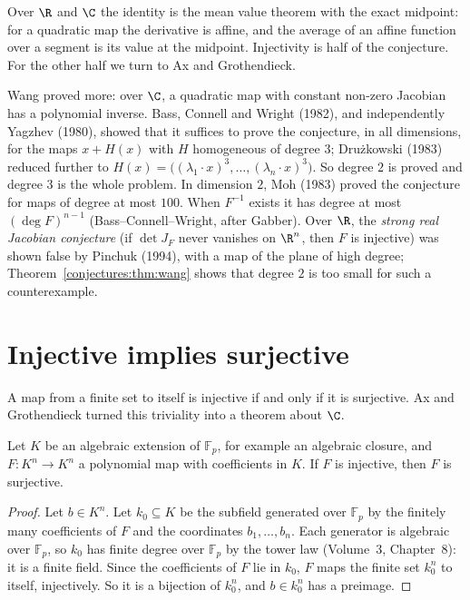 Over $\R$ and $\C$ the identity is the mean value theorem with the exact midpoint: for a quadratic map the derivative is affine, and the average of an affine
function over a segment is its value at the midpoint. Injectivity is half of the conjecture. For the other half we turn to Ax and Grothendieck.

\begin{remark}\label{conjectures:rem:jacknown}
Wang proved more: over $\C$, a quadratic map with constant non-zero Jacobian has a polynomial inverse. Bass, Connell and Wright (1982), and independently Yagzhev (1980), showed
that it suffices to prove the conjecture, in all dimensions, for the maps $x+H(x)$ with $H$ homogeneous of degree $3$; Dru\.zkowski (1983) reduced further to
$H(x)=\bigl((\lambda_1\cdot x)^3,\dots,(\lambda_n\cdot x)^3\bigr)$. So degree $2$ is proved and degree $3$ is the whole problem. In dimension $2$, Moh (1983)
proved the conjecture for maps of degree at most $100$. When $F^{-1}$ exists it has degree at most $(\deg F)^{n-1}$ (Bass--Connell--Wright, after Gabber).
Over $\R$, the \emph{strong real Jacobian conjecture} (if $\det J_F$ never vanishes on $\R^n$, then $F$ is injective) was shown false by Pinchuk
(1994), with a map of the plane of high degree; Theorem~\ref{conjectures:thm:wang} shows that degree $2$ is too small for such a counterexample.
\end{remark}

\section{Injective implies surjective}

A map from a finite set to itself is injective if and only if it is surjective. Ax and Grothendieck turned this triviality into a theorem about $\C$.

\begin{theorem}\label{conjectures:thm:axgr}
Let $K$ be an algebraic extension of $\mathbb F_p$, for example an algebraic closure, and $F:K^n\to K^n$ a polynomial map with coefficients in $K$. If $F$ is
injective, then $F$ is surjective.
\end{theorem}
\begin{proof}
Let $b\in K^n$. Let $k_0\subseteq K$ be the subfield generated over $\mathbb F_p$ by the finitely many coefficients of $F$ and the coordinates $b_1,\dots,b_n$.
Each generator is algebraic over $\mathbb F_p$, so $k_0$ has finite degree over $\mathbb F_p$ by the tower law (Volume~3, Chapter~8): it is a finite field.
Since the coefficients of $F$ lie in $k_0$, $F$ maps the finite set $k_0^n$ to itself, injectively. So it is a bijection of $k_0^n$, and $b\in k_0^n$ has a
preimage.
\end{proof}

